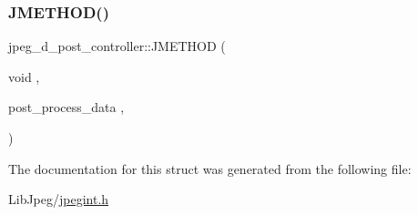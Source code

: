 \subsubsection{\texorpdfstring{JMETHOD()}{JMETHOD()}\hspace{0.1cm}{\footnotesize\ttfamily [2/2]}}
{\footnotesize\ttfamily jpeg\+\_\+d\+\_\+post\+\_\+controller\+::\+J\+M\+E\+T\+H\+OD (\begin{DoxyParamCaption}\item[{void}]{,  }\item[{post\+\_\+process\+\_\+data}]{,  }\item[{(\mbox{\hyperlink{jpeglib_8h_a00c7d78af44bd26a901c791ccfc1e178}{j\+\_\+decompress\+\_\+ptr}} cinfo, \mbox{\hyperlink{jpeglib_8h_a4bf858e4d42202287e786bdec2f3b62b}{J\+S\+A\+M\+P\+I\+M\+A\+GE}} input\+\_\+buf, \mbox{\hyperlink{jmorecfg_8h_a04ed4674f6f1d0d50ec241531e38274f}{J\+D\+I\+M\+E\+N\+S\+I\+ON}} $\ast$in\+\_\+row\+\_\+group\+\_\+ctr, \mbox{\hyperlink{jmorecfg_8h_a04ed4674f6f1d0d50ec241531e38274f}{J\+D\+I\+M\+E\+N\+S\+I\+ON}} in\+\_\+row\+\_\+groups\+\_\+avail, \mbox{\hyperlink{jpeglib_8h_ac9d5d1b829ed51769db69a37271a7e91}{J\+S\+A\+M\+P\+A\+R\+R\+AY}} \mbox{\hyperlink{jdct_8h_ad7e4660a191b1a791748dd44d5a7a0ec}{output\+\_\+buf}}, \mbox{\hyperlink{jmorecfg_8h_a04ed4674f6f1d0d50ec241531e38274f}{J\+D\+I\+M\+E\+N\+S\+I\+ON}} $\ast$out\+\_\+row\+\_\+ctr, \mbox{\hyperlink{jmorecfg_8h_a04ed4674f6f1d0d50ec241531e38274f}{J\+D\+I\+M\+E\+N\+S\+I\+ON}} out\+\_\+rows\+\_\+avail)}]{ }\end{DoxyParamCaption})}



The documentation for this struct was generated from the following file\+:\begin{DoxyCompactItemize}
\item 
Lib\+Jpeg/\mbox{\hyperlink{jpegint_8h}{jpegint.\+h}}\end{DoxyCompactItemize}
